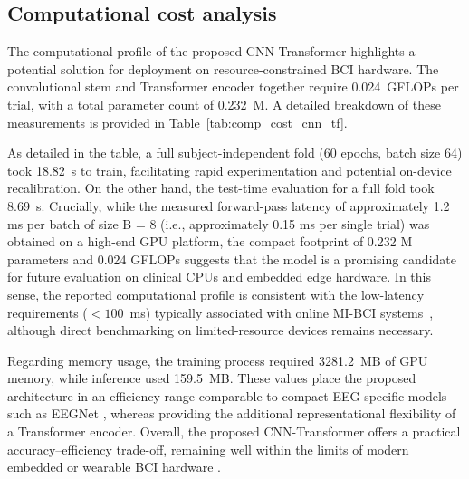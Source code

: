 \documentclass[a4paper,fleqn]{cas-dc}
\begin{document}
\subsection{Computational cost analysis}
The computational profile of the proposed CNN-Transformer highlights a potential solution for deployment on resource-constrained BCI hardware. The convolutional stem and Transformer encoder together require 0.024~GFLOPs per trial, with a total parameter count of 0.232~M. A detailed breakdown of these measurements is provided in Table~\ref{tab:comp_cost_cnn_tf}.

As detailed in the table, a full subject-independent fold (60 epochs, batch size 64) took 18.82~s to train, facilitating rapid experimentation and potential on-device recalibration. On the other hand, the test-time evaluation for a full fold took 8.69~s. Crucially, while the measured forward-pass latency of approximately 1.2 ms per batch of size B = 8 (i.e., approximately 0.15 ms per single trial) was obtained on a high-end GPU platform, the compact footprint of 0.232 M parameters and 0.024 GFLOPs suggests that the model is a promising candidate for future evaluation on clinical CPUs and embedded edge hardware. In this sense, the reported computational profile is consistent with the low-latency requirements ($<100$~ms) typically associated with online MI-BCI systems~\citep{saibene2024deep,wang2020accurate}, although direct benchmarking on limited-resource devices remains necessary. 

Regarding memory usage, the training process required 3281.2~MB of GPU memory, while inference used 159.5~MB. These values place the proposed architecture in an efficiency range comparable to compact EEG-specific models such as EEGNet \citep{9lawhern2018eegnet,wang2020accurate}, whereas providing the additional representational flexibility of a Transformer encoder. Overall, the proposed CNN-Transformer offers a practical accuracy–efficiency trade-off, remaining well within the limits of modern embedded or wearable BCI hardware \citep{george2022data,nagarajan2023relevance}.

\begin{table}[h]
\centering
\caption{Mean computational metrics of the proposed CNN-Transformer across five folds.}
\label{tab:comp_cost_cnn_tf}
\footnotesize
\begin{threeparttable}
\footnotesize
{}
\end{threeparttable}
\vspace{-10pt}
\end{table}
\end{document}
